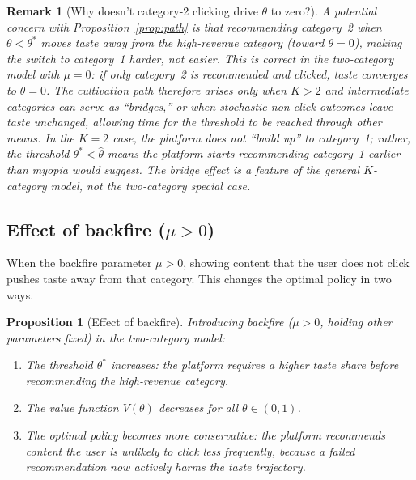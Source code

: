 \documentclass[11pt]{article}
\newtheorem{proposition}{Proposition}
\newtheorem{remark}{Remark}
\begin{document}
\begin{remark}[Why doesn't category-2 clicking drive $\theta$ to zero?]
A potential concern with Proposition~\ref{prop:path} is that recommending category~2 when $\theta < \theta^*$ moves taste \emph{away} from the high-revenue category (toward $\theta = 0$), making the switch to category~1 harder, not easier. This is correct in the two-category model with $\mu = 0$: if only category~2 is recommended and clicked, taste converges to $\theta = 0$. The cultivation path therefore arises only when $K > 2$ and intermediate categories can serve as ``bridges,'' or when stochastic non-click outcomes leave taste unchanged, allowing time for the threshold to be reached through other means. In the $K = 2$ case, the platform does not ``build up'' to category~1; rather, the threshold $\theta^* < \hat{\theta}$ means the platform starts recommending category~1 \emph{earlier} than myopia would suggest. The bridge effect is a feature of the general $K$-category model, not the two-category special case.
\end{remark}

\subsection{Effect of backfire ($\mu > 0$)}

When the backfire parameter $\mu > 0$, showing content that the user does not click pushes taste away from that category. This changes the optimal policy in two ways.

\begin{proposition}[Effect of backfire]\label{prop:backfire}
Introducing backfire ($\mu > 0$, holding other parameters fixed) in the two-category model:
\begin{enumerate}[label=(\alph*)]
\item The threshold $\theta^*$ increases: the platform requires a higher taste share before recommending the high-revenue category.
\item The value function $V(\theta)$ decreases for all $\theta \in (0,1)$.
\item The optimal policy becomes more conservative: the platform recommends content the user is unlikely to click less frequently, because a failed recommendation now actively harms the taste trajectory.
\end{enumerate}
\end{proposition}
\end{document}
